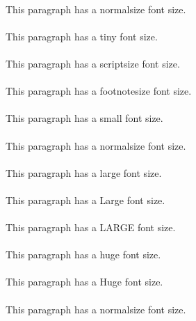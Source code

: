 \begin{sample}
    \normalsize{}\paragraph{}This paragraph has a normalsize font size.
    \tiny{}\paragraph{}This paragraph has a tiny font size.
    \scriptsize{}\paragraph{}This paragraph has a scriptsize font size.
    \footnotesize{}\paragraph{}This paragraph has a footnotesize font size.
    \small{}\paragraph{}This paragraph has a small font size.
    \normalsize{}\paragraph{}This paragraph has a normalsize font size.
    \large{}\paragraph{}This paragraph has a large font size.
    \Large{}\paragraph{}This paragraph has a Large font size.
    \LARGE{}\paragraph{}This paragraph has a LARGE font size.
    \huge{}\paragraph{}This paragraph has a huge font size.
    \Huge{}\paragraph{}This paragraph has a Huge font size.
    \normalsize{}\paragraph{}This paragraph has a normalsize font size.
\end{sample}

